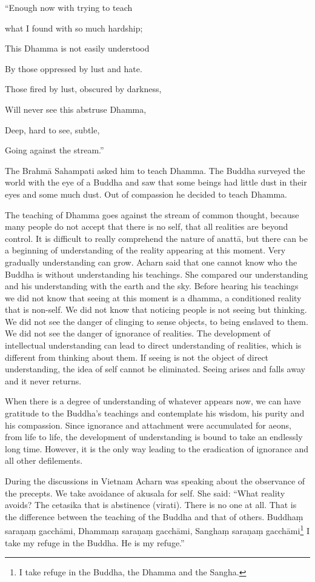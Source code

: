 {{{{{{{{{{{``Enough now with trying to teach

what I found with so much hardship;

This Dhamma is not easily understood

By those oppressed by lust and hate.

Those fired by lust, obscured by
darkness,

Will never see this abstruse Dhamma,

Deep, hard to see, subtle,

Going against the stream.''

The Brahmā Sahampati asked him to teach
Dhamma. The Buddha surveyed the world with the eye of a Buddha and saw
that some beings had little dust in their eyes and some much dust. Out
of compassion he decided to teach Dhamma.

The teaching of Dhamma goes against the
stream of common thought, because many people do not accept that there
is no self, that all realities are beyond control. It is difficult to
really comprehend the nature of anattā, but there can be a beginning of
understanding of the reality appearing at this moment. Very gradually
understanding can grow. Acharn said that one cannot know who the Buddha
is without understanding his teachings. She compared our understanding
and his understanding with the earth and the sky. Before hearing his
teachings we did not know that seeing at this moment is a dhamma, a
conditioned reality that is non-self. We did not know that noticing
people is not seeing but thinking. We did not see the danger of clinging
to sense objects, to being enslaved to them. We did not see the danger
of ignorance of realities. The development of intellectual understanding
can lead to direct understanding of realities, which is different from
thinking about them. If seeing is not the object of direct
understanding, the idea of self cannot be eliminated. Seeing arises and
falls away and it never returns. 

When there is a degree of understanding
of whatever appears now, we can have gratitude to the Buddha's teachings
and contemplate his wisdom, his purity and his compassion. Since
ignorance and attachment were accumulated for aeons, from life to life,
the development of understanding is bound to take an endlessly long
time. However, it is the only way leading to the eradication of
ignorance and all other defilements. 

During the discussions in Vietnam
Acharn was speaking about the observance of the precepts. We take
avoidance of akusala for self. She said: ``What reality avoids? The
cetasika that is abstinence (virati). There is no one at all. That is
the difference between the teaching of the Buddha and that of others.
Buddhaṃ saraṇaṃ gacchāmi, Dhammaṃ saraṇaṃ gacchāmi, Sanghaṃ saraṇaṃ
gacchāmi\footnote{I take refuge in the Buddha, the
Dhamma and the Sangha.}
I take my refuge in the Buddha. He is my refuge.'' 

}}}}}}}}}}}
